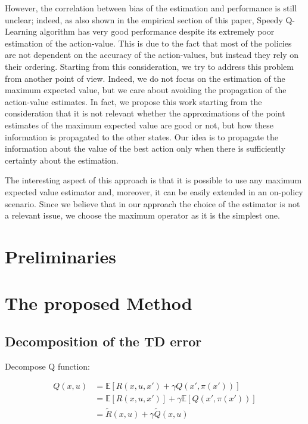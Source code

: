 \documentclass[conference]{IEEEtran}
\begin{document}
However, the correlation between bias of the estimation and performance is still unclear; indeed, as also shown in the empirical section of this paper, Speedy Q-Learning algorithm \cite{NIPS2011_4251} has very good performance despite its extremely poor estimation of the action-value. This is due to the fact that most of the policies are not dependent on the accuracy of the action-values, but instead they rely on their ordering. Starting from this consideration, we try to address this problem from another point of view. Indeed, we do not focus on the estimation of the maximum expected value, but we care about avoiding the propagation of the action-value estimates. In fact, we propose this work starting from the consideration that it is not relevant whether the approximations of the point estimates of the maximum expected value are good or not, but how these information is propagated to the other states. Our idea is to propagate the information about the value of the best action only when there is sufficiently certainty about the estimation.

The interesting aspect of this approach is that it is possible to use any maximum expected value estimator and, moreover, it can be easily extended in an on-policy scenario. Since we believe that in our approach the choice of the estimator is not a relevant issue, we choose the maximum operator as it is the simplest one.

\section{Preliminaries}

\section{The proposed Method}

\subsection{Decomposition of the TD error}

Decompose Q function:

\begin{align}
Q(x,u) & =\mathbb{E}\left[R(x,u,x')+\gamma Q(x',\pi(x'))\right] \nonumber\\ 
 & =\mathbb{E}\left[R(x,u,x')\right]+\gamma\mathbb{E}\left[Q(x',\pi(x'))\right] \nonumber\\
 & =\tilde{R}(x,u)+\gamma\tilde{Q}(x,u)
\end{align}
\end{document}
